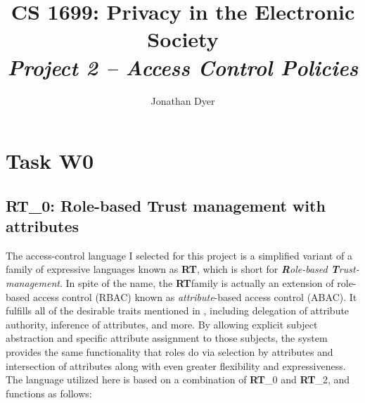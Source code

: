 \documentclass{article}
\author{Jonathan Dyer}
\title{CS 1699: Privacy in the Electronic Society \\
        \textit{Project 2 -- Access Control Policies}}
\providecommand{\task}[1]{\section{Task #1}}
\providecommand{\RT}{\textbf{RT}}
\begin{document}
\maketitle

\tableofcontents

\task{W0}
\subsection{\RT_0: Role-based Trust management with attributes}
The access-control language I selected for this project is a simplified variant of a family of expressive languages known as \RT, which is short for \textit{\textbf{R}ole-based \textbf{T}rust-management}.
In spite of the name, the \RT family is actually an extension of role-based access control (RBAC) known as \textit{attribute}-based access control (ABAC).
It fulfills all of the desirable traits mentioned in \cite{RTmain}, including delegation of attribute authority, inference of attributes, and more.
By allowing explicit subject abstraction and specific attribute assignment to those subjects, the system provides the same functionality that roles do via selection by attributes and intersection of attributes along with even greater flexibility and expressiveness.
The language utilized here is based on a combination of \RT_0 and \RT_2, and functions as follows: \\
\end{document}
